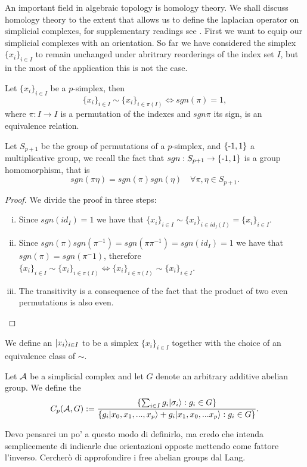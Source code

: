 \documentclass[../1.tex]{subfiles}
\begin{document}
    An important field in algebraic topology is homology theory. We shall discuss homology theory to the extent
    that allows us to define the laplacian operator on simplicial complexes, for supplementary readings see \cite{singerthorpe,hatcher}.
    First we want to equip our simplicial complexes with an orientation. So far we have considered the simplex $\{x_i\}_{i \in I}$ to remain
    unchanged under abritrary reorderings of the index set $I$, but in the most of the application this is not the case.

    \begin{prop}
        Let $\{x_i\}_{i \in I}$ be a $p$-simplex, then
        \[ \{x_i\}_{i \in I} \sim \{x_i\}_{i \in \pi(I)} \iff sgn(\pi) = 1,\]
        where $\pi : I \to I$ is a permutation of the indexes and $sgn\pi$ its sign,
        is an equivalence relation.
    \end{prop}
    \begin{rem}
        Let $S_{p+1}$ be the group of permutations of a $p$-simplex, and $\{\text{-}1,1\}$ a multiplicative group,
        we recall the fact that $sgn: S_{p+1} \to \{\text{-}1,1\}$ is a group homomorphism, that is \[sgn(\pi\eta) = sgn(\pi)sgn(\eta) \quad \forall \pi,\eta \in S_{p+1}.\]
    \end{rem}
    \begin{proof}
        We divide the proof in three steps:
        \begin{enumerate}[(i)]
            \item Since $sgn(id_I) = 1$ we have that $\{x_i\}_{i \in I} \sim \{x_i\}_{i \in id_I(I)} = \{x_i\}_{i \in I} $.
            \item Since $sgn(\pi)sgn(\pi^{-1}) = sgn(\pi\pi^{-1})=sgn(id_I)=1$ we have that $sgn(\pi) = sgn(\pi^-1)$, therefore
                  $ \{x_i\}_{i \in I} \sim \{x_i\}_{i \in \pi(I)} \iff \{x_i\}_{i \in \pi(I)} \sim \{x_i\}_{i \in I}$.
            \item The transitivity is a consequence of the fact that the product of two even permutations is also even.\qedhere
        \end{enumerate}
    \end{proof}
  
    \begin{defn}
        We define an  $| x_i \rangle_{i \in I}$ to be a simplex $\{x_i\}_{i \in I}$ together with the choice of
        an equivalence class of $\sim$.
    \end{defn}

    \begin{defn}
        Let $\mathcal{A}$ be a simplicial complex and let $G$ denote an arbitrary additive abelian group. We define the  
        \[ C_p(\mathcal{A},G) := \frac{\{ \sum_{i \in I} g_i | \sigma_i \rangle : g_i \in G \}}{\{g_i| x_0,x_1,...,x_p \rangle+g_i| x_1,x_0,...x_p \rangle : g_i \in G\} }.\]
    \end{defn}
    {\color{red} Devo pensarci un po' a questo modo di definirlo, ma credo che intenda semplicemente di indicarle due orientazioni opposte mettendo come fattore 
    l'inverso. Cercherò di approfondire i free abelian groups dal Lang.}
\end{document}
